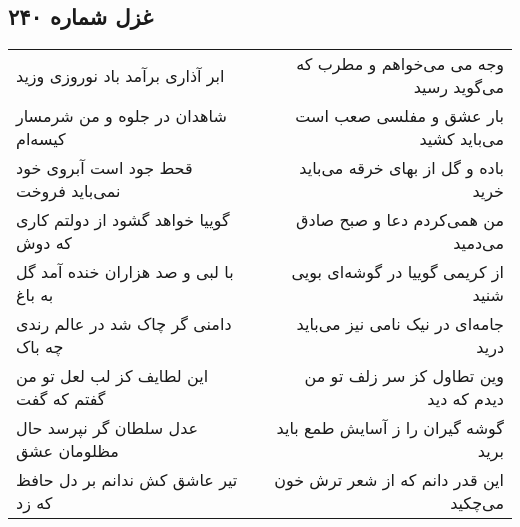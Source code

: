 \begin{center}
\section*{غزل شماره ۲۴۰}
\label{sec:sh240}
\begin{longtable}{l p{0.5cm} r}
ابر آذاری برآمد باد نوروزی وزید
&&
وجه می می‌خواهم و مطرب که می‌گوید رسید
\\
شاهدان در جلوه و من شرمسار کیسه‌ام
&&
بار عشق و مفلسی صعب است می‌باید کشید
\\
قحط جود است آبروی خود نمی‌باید فروخت
&&
باده و گل از بهای خرقه می‌باید خرید
\\
گوییا خواهد گشود از دولتم کاری که دوش
&&
من همی‌کردم دعا و صبح صادق می‌دمید
\\
با لبی و صد هزاران خنده آمد گل به باغ
&&
از کریمی گوییا در گوشه‌ای بویی شنید
\\
دامنی گر چاک شد در عالم رندی چه باک
&&
جامه‌ای در نیک نامی نیز می‌باید درید
\\
این لطایف کز لب لعل تو من گفتم که گفت
&&
وین تطاول کز سر زلف تو من دیدم که دید
\\
عدل سلطان گر نپرسد حال مظلومان عشق
&&
گوشه گیران را ز آسایش طمع باید برید
\\
تیر عاشق کش ندانم بر دل حافظ که زد
&&
این قدر دانم که از شعر ترش خون می‌چکید
\\
\end{longtable}
\end{center}
